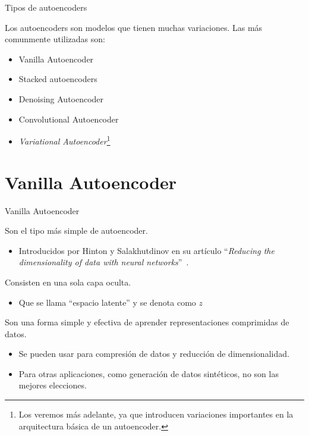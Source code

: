 \begin{frame}{Tipos de autoencoders}

Los autoencoders son modelos que tienen muchas variaciones. Las más comunmente utilizadas son:

\begin{itemize}
    \item Vanilla Autoencoder
    \item Stacked autoencoders
    \item Denoising Autoencoder
    \item Convolutional Autoencoder
    \item \textit{Variational Autoencoder}\footnote{Los veremos más adelante, ya que introducen variaciones importantes en la arquitectura básica de un autoencoder.}
\end{itemize}

\end{frame}


\section{Vanilla Autoencoder}

\begin{frame}{Vanilla Autoencoder}

Son el tipo más simple de autoencoder.

\begin{itemize}
    \item Introducidos por Hinton y Salakhutdinov en su artículo ``\textit{Reducing the dimensionality of data with neural networks}''~\cite{hinton2006reducing}.
\end{itemize}

Consisten en una sola capa oculta.

\begin{itemize}
    \item Que se llama ``espacio latente'' y se denota como $z$
\end{itemize}

Son una forma simple y efectiva de aprender representaciones comprimidas de datos.

\begin{itemize}
    \item Se pueden usar para compresión de datos y reducción de dimensionalidad.
    \item Para otras aplicaciones, como generación de datos sintéticos, no son las mejores elecciones.
\end{itemize}
\end{frame}

